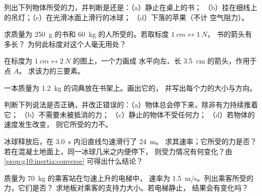 \begin{exercise}[$\star$]\label{exo:g10:inertia:1}
列出下列物体所受的力，并判断是还是：（a）静止在桌上的书；
（b）挂在细线上的吊灯；（c）在光滑冰面上滑行的冰球；
（d）下落的苹果（不计
空气阻力）。
\end{exercise}

\begin{exercise}[$\star$]\label{exo:g10:inertia:2}
求质量为 \qty{250}{g} 的书和 \qty{60}{kg}
的人所受的。若取标度 $\qty{1}{cm} \leftrightarrow \qty{1}{N}$，
书的箭头有多长？
为何此标度对这个人毫无用处？
\end{exercise}

\begin{exercise}[$\star$]\label{exo:g10:inertia:3}
在标度为 $\qty{1}{cm} \leftrightarrow \qty{2}{N}$ 的图上，一个力画成
水平向左、长 \qty{3.5}{cm} 的箭头，作用于点 $A$。
求该力的三要素。
\end{exercise}

\begin{exercise}[$\star$]\label{exo:g10:inertia:4}
一本质量为 \qty{1.2}{kg} 的词典放在书架上。画出它的，
并写出每个力的大小与方向。
\end{exercise}

\begin{exercise}[$\star$]\label{exo:g10:inertia:5}
判断下列说法是否正确，并改正错误的：（a）物体总会停下来，除非有力持续推着它；
（b）不需要未被抵消的力；
（c）静止的物体不受任何力；
（d）若物体的速度发生改变，
则它所受的力不。
\end{exercise}

\begin{exercise}[$\star\star$]\label{exo:g10:inertia:6}
冰球释放后，在 \qty{3.0}{s} 内沿直线匀速滑行了 \qty{24}{m}。
求其速率；它所受的力是否？
若在混凝土地面上，同一冰球几米之内便停下，
则受力情况有何变化？由\cref{prop:g10:inertia:converse}
可得出什么结论？
\end{exercise}

\begin{exercise}[$\star\star$]\label{exo:g10:inertia:7}
质量为 \qty{70}{kg} 的乘客站在匀速上升的电梯中，
速率为 \qty{1.5}{m/s}。列出乘客所受的力，它们是否？
求地板对乘客的支持力大小。若电梯静止，
结果会有变化吗？
\end{exercise}

